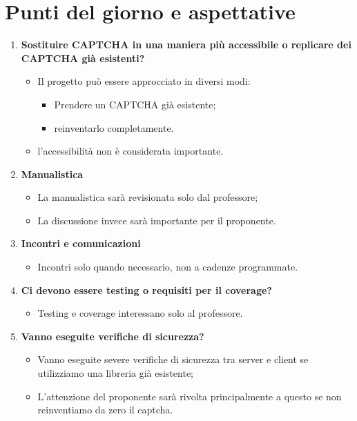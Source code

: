 \section{Punti del giorno e aspettative}
\begin{enumerate}
    \item \textbf{Sostituire CAPTCHA in una maniera più accessibile o replicare dei CAPTCHA già esistenti?}
        \begin{itemize}
            \item Il progetto può essere approcciato in diversi modi:
            \begin{itemize}
                \item Prendere un CAPTCHA già esistente;
                \item reinventarlo completamente.
            \end{itemize}
            \item l'accessibilità non è considerata importante.
        \end{itemize}
    \item \textbf{Manualistica}
        \begin{itemize}
            \item La manualistica sarà revisionata solo dal professore;
            \item La discussione invece sarà importante per il proponente.
        \end{itemize}
    \item \textbf{Incontri e comunicazioni}
        \begin{itemize}
            \item Incontri solo quando necessario, non a cadenze programmate.
        \end{itemize}
    \item \textbf{Ci devono essere testing o requisiti per il coverage?}
        \begin{itemize}
            \item Testing e coverage interessano solo al professore.
        \end{itemize}
    \item \textbf{Vanno eseguite verifiche di sicurezza?}
        \begin{itemize}
            \item Vanno eseguite severe verifiche di sicurezza tra server e client se utilizziamo una libreria già esistente;
            \item L'attenzione del proponente sarà rivolta principalmente a questo se non reinventiamo da zero il captcha.
        \end{itemize}
\end{enumerate}
